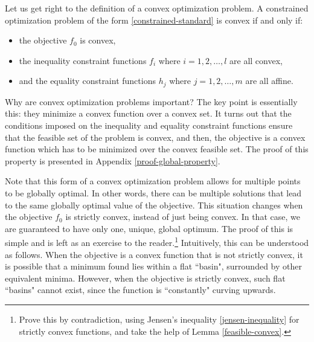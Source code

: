 \documentclass[a4paper]{article}
\theoremstyle{definition}
\begin{document}
Let us get right to the definition of a convex optimization problem.
A constrained optimization problem of the form \eqref{constrained-standard} is convex if and only if:
\begin{itemize}
	\item the objective $f_0$ is convex,
	\item the inequality constraint functions $f_i$ where $i = 1, 2, \dots, l$ are all convex,
	\item and the equality constraint functions $h_j$ where $j = 1, 2, \dots, m$ are all affine.
\end{itemize}

Why are convex optimization problems important?
The key point is essentially this: they minimize a convex function over a convex set.
It turns out that the conditions imposed on the inequality and equality constraint functions ensure that the feasible set of the problem is convex, and then, the objective is a convex function which has to be minimized over the convex feasible set.
The proof of this property is presented in Appendix \ref{proof-global-property}.


Note that this form of a convex optimization problem allows for multiple points to be globally optimal.
In other words, there can be multiple solutions that lead to the same globally optimal value of the objective.
This situation changes when the objective $f_0$ is strictly convex, instead of just being convex.
In that case, we are guaranteed to have only one, unique, global optimum.
The proof of this is simple and is left as an exercise to the reader.\footnote{
	Prove this by contradiction, using Jensen's inequality \eqref{jensen-inequality} for strictly convex functions, and take the help of Lemma \ref{feasible-convex}.
}
Intuitively, this can be understood as follows.
When the objective is a convex function that is not strictly convex, it is possible that a minimum found lies within a flat ``basin", surrounded by other equivalent minima.
However, when the objective is strictly convex, such flat ``basins" cannot exist, since the function is ``constantly" curving upwards.
\end{document}

